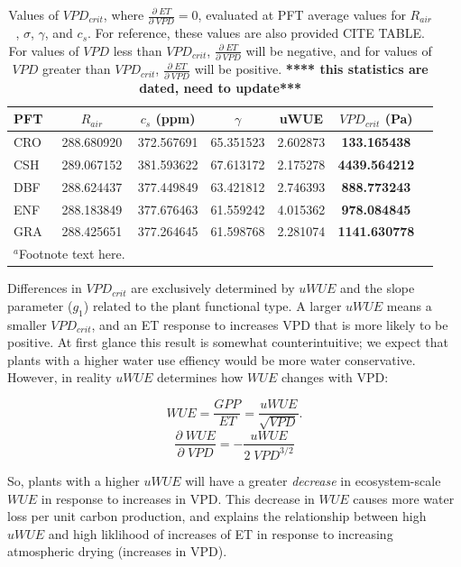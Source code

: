 \documentclass[draft,linenumbers]{agujournal}
\begin{document}
\begin{table}  
\caption{Values of $VPD_{crit}$, where $\frac{\partial \; ET}{\partial \; VPD} = 0$, evaluated at PFT average values for $R_{air}$, $\sigma$, $\gamma$, and $c_s$. For reference, these values are also provided CITE TABLE. For values of $VPD$ less than $VPD_{crit}$, $\frac{\partial \; ET}{\partial \; VPD}$ will be negative, and for values of $VPD$ greater than $VPD_{crit}$, $\frac{\partial \; ET}{\partial \; VPD}$ will be positive. \textbf{**** this statistics are dated, need to update***}}
\centering
\begin{tabular}{l c c c c c c}
  \hline
  PFT & $R_{air}$ & $c_s$ (ppm) & $\gamma$ &  uWUE    & \textbf{$VPD_{crit}$ (Pa)} \\
  \hline
  CRO &  288.680920 & 372.567691& 65.351523& 2.602873&  \textbf{133.165438} \\
  CSH &   289.067152& 381.593622& 67.613172& 2.175278& \textbf{4439.564212} \\
  DBF &   288.624437& 377.449849& 63.421812& 2.746393&  \textbf{888.773243} \\
  ENF &  288.183849& 377.676463& 61.559242& 4.015362&  \textbf{978.084845} \\
  GRA &  288.425651& 377.264645& 61.598768& 2.281074& \textbf{1141.630778} \\
\hline
\multicolumn{2}{l}{$^{a}$Footnote text here.}
\end{tabular}
\label{vpd_crit}
\end{table}

Differences in $VPD_{crit}$ are exclusively determined by $uWUE$ and the slope parameter ($g_1$) related to the plant functional type. A larger $uWUE$ means a smaller $VPD_{crit}$, and an ET response to increases VPD that is more likely to be positive. At first glance this result is somewhat counterintuitive; we expect that plants with a higher water use effiency would be more water conservative. However, in reality $uWUE$ determines how $WUE$ changes with VPD:

\[WUE = \frac{GPP}{ET} = \frac{uWUE}{\sqrt{VPD}}.\]
\[\frac{\partial \; WUE}{\partial \; VPD} = -\frac{uWUE}{2 \; VPD^{3/2}}\]

So, plants with a higher $uWUE$ will have a greater \textit{decrease} in ecosystem-scale $WUE$ in response to increases in VPD. This decrease in $WUE$ causes more water loss per unit carbon production, and explains the relationship between high $uWUE$ and high liklihood of increases of ET in response to increasing atmospheric drying (increases in VPD).
\end{document}
